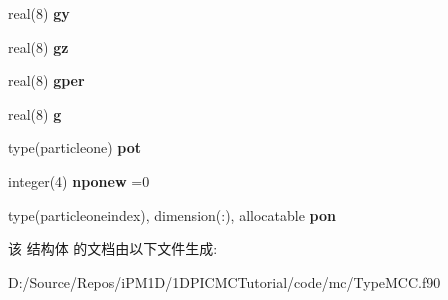 \begin{DoxyCompactItemize}
\mbox{\label{structmoduletypemcc_1_1mccparticleone_a73a77f7b45c11d76b12cdfa6d5f29309}} 
real(8) {\bfseries gy}
\item 
\mbox{\label{structmoduletypemcc_1_1mccparticleone_a33b52072901f716acb935cc692e0d4cd}} 
real(8) {\bfseries gz}
\item 
\mbox{\label{structmoduletypemcc_1_1mccparticleone_aa9c650bc1d2058c931297dce2c90ef39}} 
real(8) {\bfseries gper}
\item 
\mbox{\label{structmoduletypemcc_1_1mccparticleone_a2fd84c9595aa6fd0c3c500c240ac0de6}} 
real(8) {\bfseries g}
\item 
\mbox{\label{structmoduletypemcc_1_1mccparticleone_a61c0e4b195b9c4ef4479e70578f5ceeb}} 
type(particleone) {\bfseries pot}
\item 
\mbox{\label{structmoduletypemcc_1_1mccparticleone_a8e2b9756daa858b25389dbfc4157c08b}} 
integer(4) {\bfseries nponew} =0
\item 
\mbox{\label{structmoduletypemcc_1_1mccparticleone_ac126830c6e1ed0b92082376bce064482}} 
type(particleoneindex), dimension(\+:), allocatable {\bfseries pon}
\end{DoxyCompactItemize}


该 结构体 的文档由以下文件生成\+:\begin{DoxyCompactItemize}
\item 
D\+:/\+Source/\+Repos/i\+P\+M1\+D/1\+D\+P\+I\+C\+M\+C\+Tutorial/code/mc/Type\+M\+C\+C.\+f90\end{DoxyCompactItemize}
